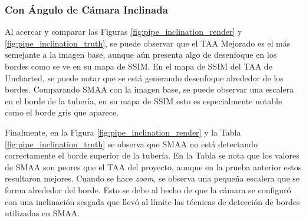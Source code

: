 \documentclass[pregrado]{tesis-usb} %
\begin{document}
\FloatBarrier

\subsubsection{Con Ángulo de Cámara Inclinada}
Al acercar y comparar las Figuras \ref{fig:pipe_inclination_render} y \ref{fig:pipe_inclination_truth}, se puede observar que el TAA Mejorado es el más semejante a la imagen base, aunque aún presenta algo de desenfoque en los bordes como se ve en su mapa de SSIM. En el mapa de SSIM del TAA de Uncharted, se puede notar que se está generando desenfoque alrededor de los bordes. Comparando SMAA con la imagen base, se puede observar una escalera en el borde de la tubería, en su mapa de SSIM esto es especialmente notable como el borde gris que aparece.

Finalmente, en la Figura \ref{fig:pipe_inclination_render} y la Tabla \ref{fig:pipe_inclination_truth} se observa que SMAA no está detectando correctamente el borde superior de la tubería. En la Tabla se nota que los valores de SMAA son peores que el TAA del proyecto, aunque en la prueba anterior estos resultaron mejores. Cuando se hace \textit{zoom}, se observa una pequeña escalera que se forma alrededor del borde. Esto se debe al hecho de que la cámara se configuró con una inclinación sesgada que llevó al límite las técnicas de detección de bordes utilizadas en SMAA.
\end{document}
